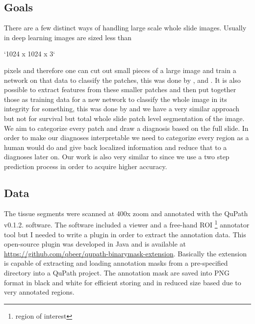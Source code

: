 \documentclass[a4paper,12pt]{article}
\begin{document}
\vspace{4mm}

\subsection{Goals}

\vspace{4mm}

\par There are a few distinct ways of handling large scale whole slide images. Usually in deep learning images are sized less than \begin{markdown}
`1024 x 1024 x 3`
\end{markdown} 
pixels and therefore one can cut out small pieces of a large image and train a network on that data to classify the patches, this was done by \cite{korbar2017deep}, \cite{bychkov2018deep} and \cite{skrede2020deep}. It is also possible to extract features from these smaller patches and then put together those as training data for a new network to classify the whole image in its integrity for something, this was done by \cite{skrede2020deep} and we have a very similar approach but not for survival but total whole slide patch level segmentation of the image. We aim to categorize every patch and draw a diagnosis based on the full slide. In order to make our diagnoses interpretable we need to categorize every region as a human would do and give back localized information and reduce that to a diagnoses later on. Our work is also very similar to \cite{takahama2019multi} since we use a two step prediction process in order to acquire higher accuracy.

\vspace{4mm}

\subsection{Data}

\vspace{4mm}

\par The tissue segments were scanned at 400x zoom and annotated with the QuPath v0.1.2. software. The software included a viewer and a free-hand ROI \footnote{region of interest} annotator tool but I needed to write a plugin in order to extract the annotation data. This open-source plugin was developed in Java and is available at \url{https://github.com/qbeer/qupath-binarymask-extension}. Basically the extension is capable of extracting and loading annotation masks from a pre-specified directory into a QuPath project. The annotation mask are saved into PNG format in black and white for efficient storing and in reduced size based due to very annotated regions.
\end{document}
